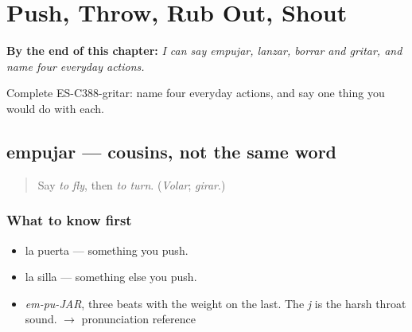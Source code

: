 
\chapter{Push, Throw, Rub Out, Shout}
\label{ch:empujar-y-lanzar}

\begin{chapteropening}
\textbf{By the end of this chapter:} \emph{I can say empujar, lanzar, borrar and gritar, and name four everyday actions.}

Complete ES-C388-gritar: name four everyday actions, and say one thing you would do with each.
\end{chapteropening}

\section[empujar]{empujar — cousins, not the same word}

\label{lesson:ES-C388-empujar}



\begin{quote}
Say \emph{to fly}, then \emph{to turn}. (\emph{Volar}; \emph{girar}.)
\end{quote}

\subsection*{What to know first}
\begin{itemize}
\raggedright
  \item la puerta — something you push.
  \item la silla — something else you push.
\end{itemize}

\begin{sounds}
\begin{itemize}
\raggedright
  \item \emph{em-pu-JAR}, three beats with the weight on the last. The \emph{j} is the harsh throat sound. $\to$ pronunciation reference
\end{itemize}
\end{sounds}

